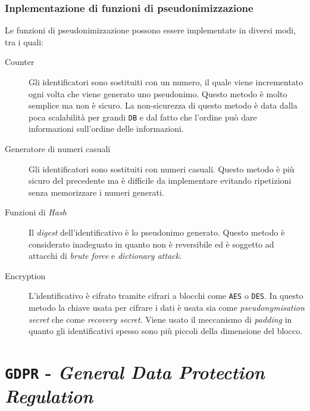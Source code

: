         \subsubsection{Inplementazione di funzioni di pseudonimizzazione} 
            Le funzioni di pseudonimizzazione possono essere implementate in diversi modi, tra i quali:
            \begin{description}
                \item[Counter] Gli identificatori sono sostituiti con un numero, il quale viene incrementato ogni volta che viene generato uno pseudonimo. Questo metodo è molto semplice ma non è sicuro. La non-sicurezza di questo metodo è data dalla poca scalabilità per grandi \texttt{DB} e dal fatto che l'ordine può dare informazioni sull'ordine delle informazioni.
                \item[Generatore di numeri casuali] Gli identificatori sono sostituiti con numeri casuali. Questo metodo è più sicuro del precedente ma è difficile da implementare evitando ripetizioni senza memorizzare i numeri generati.
                \item[Funzioni di \textit{Hash}] Il \textit{digest} dell'identificativo è lo pseudonimo generato. Questo metodo è considerato inadeguato in quanto non è reversibile ed è soggetto ad attacchi di \textit{brute force} e \textit{dictionary attack}.
                \item[Encryption] L'identificativo è cifrato tramite cifrari a blocchi come \texttt{AES} o \texttt{DES}. In questo metodo la chiave usata per cifrare i dati è usata sia come \textit{pseudonymisation secret} che come \textit{recovery secret}. Viene usato il meccanismo di \textit{padding} in quanto gli identificativi spesso sono più piccoli della dimensione del blocco.
            \end{description} 
\section{\texttt{GDPR} - \textit{General Data Protection Regulation}}
